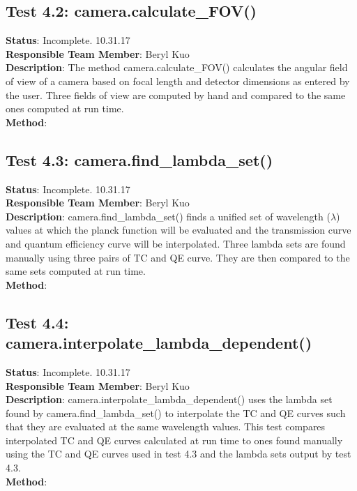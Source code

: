 \documentclass[]{DINOReportMemo}
\begin{document}
\subsection{Test 4.2: camera.calculate\_FOV()}
\textbf{Status}: Incomplete. 10.31.17\\
\textbf{Responsible Team Member}: Beryl Kuo \\
\textbf{Description}: The method camera.calculate\_FOV() calculates the angular field of view of a camera based on focal length and detector dimensions as entered by the user. Three fields of view are computed by hand and compared to the same ones computed at run time.\\
\textbf{Method}: \\

\subsection{Test 4.3: camera.find\_lambda\_set()}
\textbf{Status}: Incomplete. 10.31.17\\
\textbf{Responsible Team Member}: Beryl Kuo \\
\textbf{Description}: camera.find\_lambda\_set() finds a unified set of wavelength ($\lambda$) values at which the planck function will be evaluated and the transmission curve and quantum efficiency curve will be interpolated. Three lambda sets are found manually using three pairs of TC and QE curve. They are then compared to the same sets computed at run time.\\
\textbf{Method}: \\

\subsection{Test 4.4: camera.interpolate\_lambda\_dependent()}
\textbf{Status}: Incomplete. 10.31.17\\
\textbf{Responsible Team Member}: Beryl Kuo \\
\textbf{Description}: camera.interpolate\_lambda\_dependent() uses the lambda set found by camera.find\_lambda\_set() to interpolate the TC and QE curves such that they are evaluated at the same wavelength values. This test compares interpolated TC and QE curves calculated at run time to ones found manually using the TC and QE curves used in test 4.3 and the lambda sets output by test 4.3. \\
\textbf{Method}: \\
\end{document}
